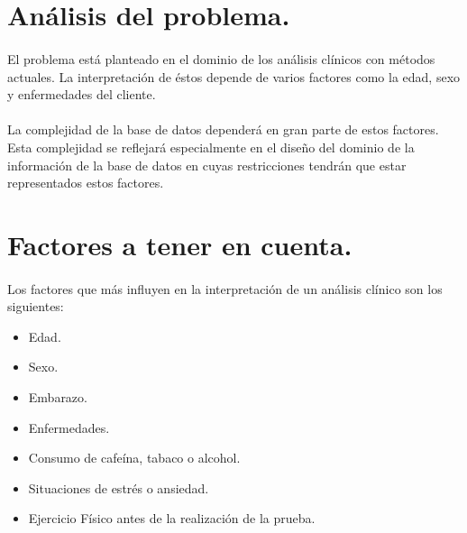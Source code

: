 \documentclass[a4paper,10pt]{article}
\begin{document}
\section{Análisis del problema.}
\paragraph{}
El problema está planteado en el dominio de los análisis clínicos con métodos actuales. La interpretación de éstos depende de varios factores como la edad, sexo y enfermedades del cliente.
\paragraph{}
La complejidad de la base de datos dependerá en gran parte de estos factores. Esta complejidad se reflejará especialmente en el diseño del dominio de la información de la base de datos en cuyas restricciones tendrán que estar representados estos factores.


\section{Factores a tener en cuenta.}
\label{section:factoresatenerencuenta}
\paragraph{}
Los factores que más influyen en la interpretación de un análisis clínico son los siguientes:
\begin{itemize}
	\item Edad.
	\item Sexo.
	\item Embarazo.
	\item Enfermedades.
	\item Consumo de cafeína, tabaco o alcohol.
	\item Situaciones de estrés o ansiedad.
	\item Ejercicio Físico antes de la realización de la prueba.
\end{itemize}
\end{document}
